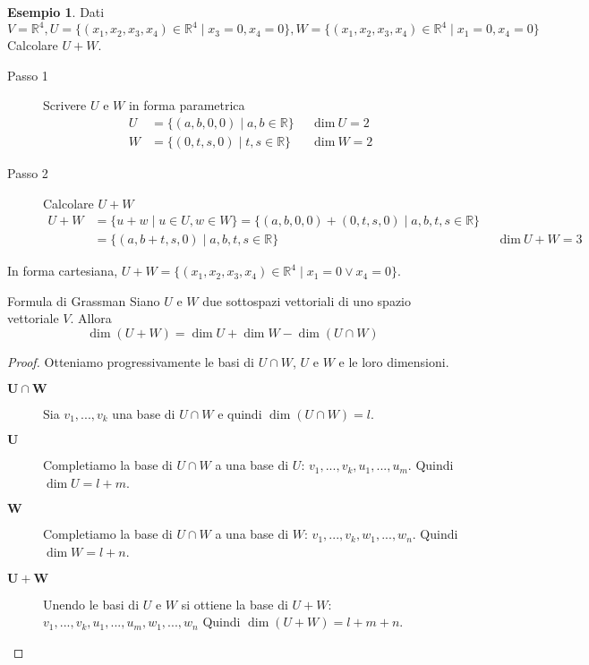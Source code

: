 \documentclass[a4paper]{article}
\theoremstyle{definition}
\newtheorem*{es}{Esempio}
\begin{document}
\begin{es}
	Dati $V = \mathbb{R}^4, U = \{ (x_1, x_2, x_3, x_4) \in \mathbb{R}^4 \mid x_3 = 0, x_4 = 0 \}, W = \{ (x_1, x_2, x_3, x_4) \in \mathbb{R}^4 \mid x_1 = 0, x_4 = 0 \}$ \\
	Calcolare $U + W$.
	\begin{description}
		\item[Passo 1] Scrivere $U$ e $W$ in forma parametrica
		      \begin{align*}
			      U & = \{(a, b, 0, 0) \mid a, b \in \mathbb{R}\} &  & \text{dim} \ U = 2 \\
			      W & = \{(0, t, s, 0) \mid t, s \in \mathbb{R}\} &  & \text{dim} \ W = 2
		      \end{align*}
		\item[Passo 2] Calcolare $U + W$
		      \begin{align*}
			      U + W & = \{u + w \mid u \in U, w \in W\} = \{(a, b, 0, 0) + (0, t, s, 0) \mid a, b, t, s \in \mathbb{R}\}                             \\
			            & = \{(a, b + t, s, 0) \mid a, b, t, s \in \mathbb{R}\}                                              &  & \text{dim} \ U + W = 3
		      \end{align*}
	\end{description}
	In forma cartesiana, $U + W = \{(x_1, x_2, x_3, x_4) \in \mathbb{R}^4 \mid x_1 = 0 \lor x_4 = 0\}$.
\end{es}

\begin{teo}{Formula di Grassman}{}
	Siano $U$ e $W$ due sottospazi vettoriali di uno spazio vettoriale $V$. Allora
	\begin{equation*}
		\dim(U + W) = \dim U + \dim W - \dim(U \cap W)
	\end{equation*}
\end{teo}
\begin{proof}
	Otteniamo progressivamente le basi di $U \cap W$, $U$ e $W$ e le loro dimensioni.
	\begin{description}
		\item[$\mathbf{U \cap W}$] Sia $v_1, ..., v_k$ una base di $U \cap W$ e quindi $\dim(U \cap W) = l$.
		\item[$\mathbf{U}$] Completiamo la base di $U \cap W$ a una base di $U$: $v_1, ..., v_k, u_1, ..., u_m$.
		      Quindi $\dim U = l + m$.
		\item[$\mathbf{W}$] Completiamo la base di $U \cap W$ a una base di $W$: $v_1, ..., v_k, w_1, ..., w_n$.
			  Quindi $\dim W = l + n$.
		\item[$\mathbf{U + W}$] Unendo le basi di $U$ e $W$ si ottiene la base di $U + W$:$v_1, ..., v_k, u_1, ..., u_m, w_1, ..., w_n$
		      Quindi $\dim(U + W) = l + m + n$.
	\end{description}
\end{proof}
\end{document}
